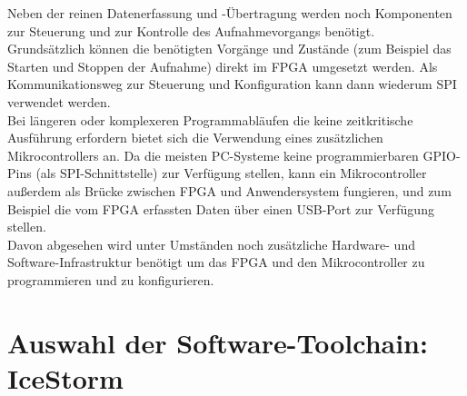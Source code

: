 Neben der reinen Datenerfassung und -Übertragung werden noch Komponenten zur Steuerung und zur Kontrolle des Aufnahmevorgangs benötigt.\\
Grundsätzlich können die benötigten Vorgänge und Zustände (zum Beispiel das Starten und Stoppen der Aufnahme) direkt im FPGA umgesetzt werden. Als Kommunikationsweg zur Steuerung und Konfiguration kann dann wiederum SPI verwendet werden.\\
Bei längeren oder komplexeren Programmabläufen die keine zeitkritische Ausführung erfordern bietet sich die Verwendung eines zusätzlichen Mikrocontrollers an. Da die meisten PC-Systeme keine programmierbaren \acrshort{GPIO}-Pins (als SPI-Schnittstelle) zur Verfügung stellen, kann ein Mikrocontroller außerdem als Brücke zwischen FPGA und Anwendersystem fungieren, und zum Beispiel die vom FPGA erfassten Daten über einen USB-Port zur Verfügung stellen.\\
Davon abgesehen wird unter Umständen noch zusätzliche Hardware- und Software-Infrastruktur benötigt um das FPGA und den Mikrocontroller zu programmieren und zu konfigurieren.
\clearpage

\section{Auswahl der Software-Toolchain: IceStorm}


